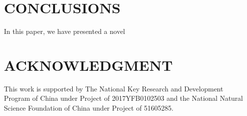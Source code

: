 \documentclass{svproc}
\begin{document}

\section{CONCLUSIONS}

In this paper, we have presented a novel


\section*{ACKNOWLEDGMENT}

This work is supported by The National Key Research and Development Program of China under Project of 2017YFB0102503 and the National Natural Science Foundation of China under Project of 51605285.



\end{document}
